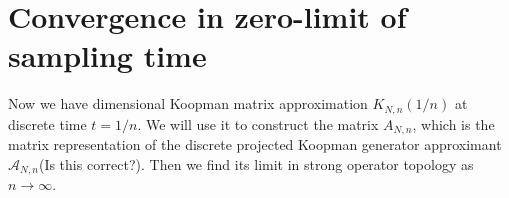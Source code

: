 \documentclass{article}[11]
\newtheorem*{remark}{Remark}
\begin{document}
	
	
	
	\newpage
	\section{Convergence in zero-limit of sampling time}
	Now we have dimensional Koopman matrix approximation $K_{N,n}(1/n)$ at discrete time $t=1/n$. We will use it to construct the matrix $A_{N,n}$, which is the matrix representation of the discrete projected Koopman generator approximant $\mathcal{A}_{N,n}$(Is this correct?). Then we find its limit in strong operator topology as $n\to\infty$. 
	
\end{document}
